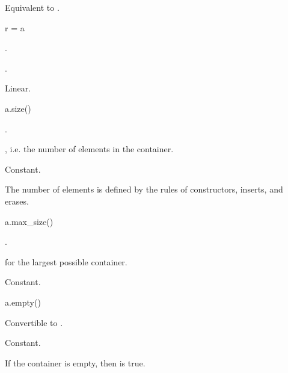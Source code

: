 \begin{itemdescr}
\pnum
\effects
Equivalent to .
\end{itemdescr}

%
\begin{itemdecl}
r = a
\end{itemdecl}

\begin{itemdescr}
\pnum
\result
{}.

\pnum
\ensures
{}.

\pnum
\complexity
Linear.
\end{itemdescr}

%
\begin{itemdecl}
a.size()
\end{itemdecl}

\begin{itemdescr}
\pnum
\result
{}.

\pnum
\returns
{},
i.e. the number of elements in the container.

\pnum
\complexity
Constant.

\pnum
\remarks
The number of elements is defined by the rules of
constructors, inserts, and erases.
\end{itemdescr}

%
\begin{itemdecl}
a.max_size()
\end{itemdecl}

\begin{itemdescr}
\pnum
\result
{}.

\pnum
\returns
{} for the largest possible container.

\pnum
\complexity
Constant.
\end{itemdescr}

%
\begin{itemdecl}
a.empty()
\end{itemdecl}

\begin{itemdescr}
\pnum
\result
Convertible to .

\pnum
\returns
{}

\pnum
\complexity
Constant.

\pnum
\remarks
If the container is empty, then  is true.
\end{itemdescr}

